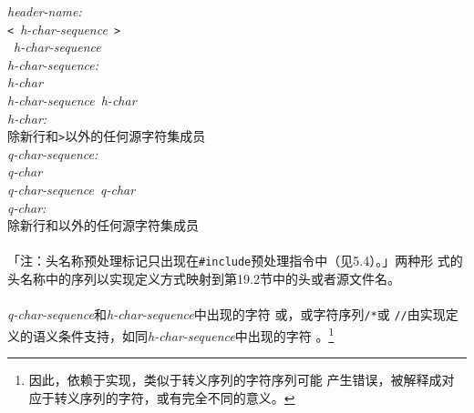 \noindent \mbox{\qquad \textit{header-name:}}                                 \\
\mbox{\qquad \qquad \texttt{<} \textit{h-char-sequence} \texttt{>}}           \\
\mbox{\qquad \qquad \texttt{\qdbl} \textit{h-char-sequence} \texttt{\qdbl}}   \\
\noindent \mbox{\qquad \textit{h-char-sequence:}}                             \\
\mbox{\qquad \qquad \textit{h-char}}                                          \\
\mbox{\qquad \qquad \textit{h-char-sequence} \textit{h-char}}                 \\
\noindent \mbox{\qquad \textit{h-char:}}                                      \\
\mbox{\qquad \qquad 除新行和\texttt{>}以外的任何源字符集成员}                 \\
\noindent \mbox{\qquad \textit{q-char-sequence:}}                             \\
\mbox{\qquad \qquad \textit{q-char}}                                          \\
\mbox{\qquad \qquad \textit{q-char-sequence} \textit{q-char}}                 \\
\noindent \mbox{\qquad \textit{q-char:}}                                      \\
\mbox{\qquad \qquad 除新行和\texttt{\qdbl}以外的任何源字符集成员}

\paragraph{}
「注：头名称预处理标记只出现在\texttt{\#include}预处理指令中（见5.4）。」两种形
式的头名称中的序列以实现定义方式映射到第19.2节中的头或者源文件名。

\paragraph{}
\textit{q-char-sequence}和\textit{h-char-sequence}中出现的字符
\texttt{\qsgl}或\texttt{\qdbl}，或字符序列\texttt{/*}或
\texttt{//}由实现定义的语义条件支持，如同\textit{h-char-sequence}中出现的字符
\texttt{\qdbl}。\footnote{因此，依赖于实现，类似于转义序列的字符序列可能
产生错误，被解释成对应于转义序列的字符，或有完全不同的意义。}

